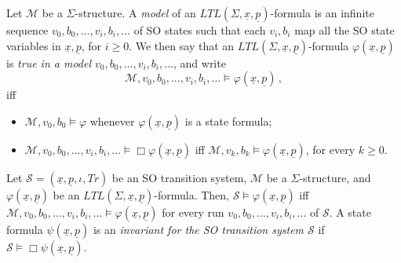 \documentclass[conference]{IEEEtran}
\begin{document}
Let $\mathcal{M}$ be a $\Sigma$-structure.  A \emph{model} of an
$\mathit{LTL}(\Sigma,\underline{x},\underline{p})$-formula is an
infinite sequence $v_0,b_0, ..., v_i,b_i, ...$ of SO states such that
each $v_i,b_i$ map all the SO state variables in
$\underline{x},\underline{p}$, for $i\geq 0$.
We then say that an
$\mathit{LTL}(\Sigma,\underline{x},\underline{p})$-formula
$\varphi(\underline{x},\underline{p})$ is \emph{true in a model
$v_0,b_0, ..., v_i,b_i, ...$}, and write
\begin{displaymath}
\mathcal{M}, v_0,b_0,..., v_i,b_i, ... \models \varphi(\underline{x},\underline{p})\,,
\end{displaymath}
iff
\begin{itemize}
\item $\mathcal{M}, v_0, b_0 \models \varphi$ whenever
  $\varphi(\underline{x},\underline{p})$ is a state formula;
\item $\mathcal{M}, v_0,b_0, ..., v_i,b_i, ...  \models \Box
  \varphi(\underline{x},\underline{p})$ iff $\mathcal{M}, v_k, b_k
  \models \varphi(\underline{x},\underline{p})$, for every $k\geq 0$.
\end{itemize}

Let $\mathcal{S}=(\underline{x},\underline{p}, \iota, \mathit{Tr})$ be
an SO transition system, $\mathcal{M}$ be a $\Sigma$-structure, and
$\varphi(\underline{x},\underline{p})$ be an
$\mathit{LTL}(\Sigma,\underline{x},\underline{p})$-formula.  Then,
$\mathcal{S}\models \varphi(\underline{x},\underline{p})$ iff
$\mathcal{M},v_0, b_0, ..., v_i,b_i, ... \models
\varphi(\underline{x},\underline{p})$ for every run $v_0, b_0, ...,
v_i,b_i, ... $ of $\mathcal{S}$.
A state formula $\psi(\underline{x},\underline{p})$ is an
\emph{invariant for the SO transition system $\mathcal{S}$} if
$\mathcal{S}\models \Box \psi(\underline{x},\underline{p})$.
\end{document}
